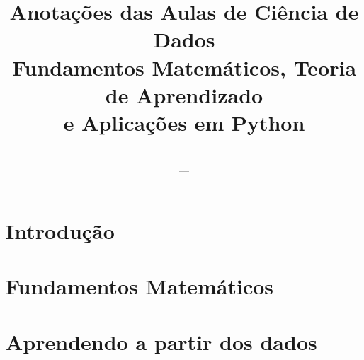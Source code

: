 \documentclass[ebook,10pt,oneside,openany]{memoir}
\title{Anotações das Aulas de Ciência de Dados\\
  \large Fundamentos Matemáticos, Teoria de Aprendizado  \\
  e Aplicações em Python}
\author{--- \\---}
\begin{document}
\maketitle

\newpage
\tableofcontents
\part{Introdução}

\part{Fundamentos Matemáticos}

\part{ Aprendendo a partir dos dados}


\end{document}
